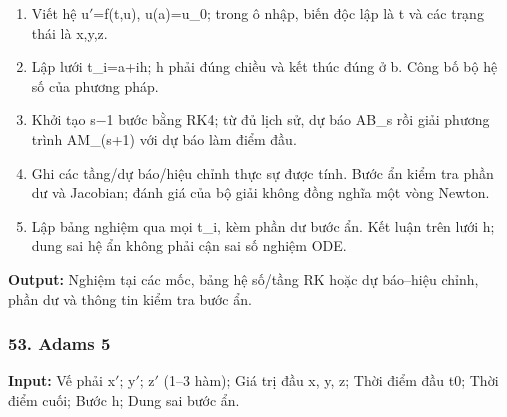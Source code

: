 \begin{enumerate}

\item Viết hệ u\ensuremath{\prime}=\allowbreak{}f(\allowbreak{}t,\allowbreak{}u),\allowbreak{} u(\allowbreak{}a)=\allowbreak{}u\_0;\allowbreak{} trong ô nhập,\allowbreak{} biến độc lập là t và các trạng thái là x,\allowbreak{}y,\allowbreak{}z.

\item Lập lưới t\_i=\allowbreak{}a+\allowbreak{}ih;\allowbreak{} h phải đúng chiều và kết thúc đúng ở b. Công bố bộ hệ số của phương pháp.

\item Khởi tạo s\ensuremath{-}1 bước bằng RK4;\allowbreak{} từ đủ lịch sử,\allowbreak{} dự báo AB\_s rồi giải phương trình AM\_(\allowbreak{}s+\allowbreak{}1) với dự báo làm điểm đầu.

\item Ghi các tầng/\allowbreak{}dự báo/\allowbreak{}hiệu chỉnh thực sự được tính. Bước ẩn kiểm tra phần dư và Jacobian;\allowbreak{} đánh giá của bộ giải không đồng nghĩa một vòng Newton.

\item Lập bảng nghiệm qua mọi t\_i,\allowbreak{} kèm phần dư bước ẩn. Kết luận trên lưới h;\allowbreak{} dung sai hệ ẩn không phải cận sai số nghiệm ODE.

\end{enumerate}

\textbf{Output:} Nghiệm tại các mốc,\allowbreak{} bảng hệ số/\allowbreak{}tầng RK hoặc dự báo–hiệu chỉnh,\allowbreak{} phần dư và thông tin kiểm tra bước ẩn.

\examplebreak\subsubsection*{53. Adams 5}

\textbf{Input:} Vế phải x\ensuremath{\prime};\allowbreak{} y\ensuremath{\prime};\allowbreak{} z\ensuremath{\prime} (\allowbreak{}1–3 hàm);\allowbreak{} Giá trị đầu x,\allowbreak{} y,\allowbreak{} z;\allowbreak{} Thời điểm đầu t0;\allowbreak{} Thời điểm cuối;\allowbreak{} Bước h;\allowbreak{} Dung sai bước ẩn.

